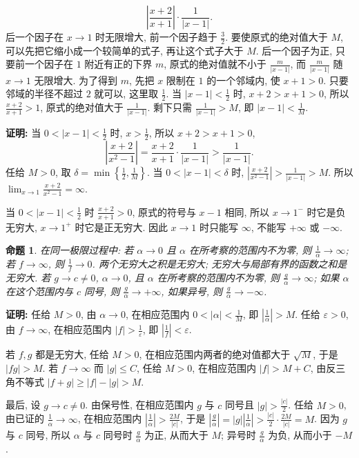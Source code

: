 \documentclass[UTF8,openany]{ctexbook}
\theoremstyle{chinesetextbook}
\newtheorem{proposition}{命题}[section]
\newenvironment{cnproof}{\par\indent\textbf{证明:} \ignorespaces}{\par}
\begin{document}
\[
\left|\frac{x+2}{x+1}\right|\cdot\frac1{|x-1|}.
\]
后一个因子在 $x\to1$ 时无限增大, 前一个因子趋于 $\displaystyle\frac32$. 要使原式的绝对值大于 $M$, 可以先把它缩小成一个较简单的式子, 再让这个式子大于 $M$. 后一个因子为正, 只要前一个因子在 $1$ 附近有正的下界 $m$, 原式的绝对值就不小于 $\displaystyle\frac m{|x-1|}$, 而 $\displaystyle\frac m{|x-1|}$ 随 $x\to1$ 无限增大. 为了得到 $m$, 先把 $x$ 限制在 $1$ 的一个邻域内, 使 $x+1>0$. 只要邻域的半径不超过 $2$ 就可以, 这里取 $\displaystyle\frac12$. 当 $\displaystyle|x-1|<\frac12$ 时, $x+2>x+1>0$, 所以 $\displaystyle\frac{x+2}{x+1}>1$, 原式的绝对值大于 $\displaystyle\frac1{|x-1|}$. 剩下只需 $\displaystyle\frac1{|x-1|}>M$, 即 $\displaystyle|x-1|<\frac1M$.
\begin{cnproof}
当 $\displaystyle0<|x-1|<\frac12$ 时, $\displaystyle x>\frac12$, 所以 $x+2>x+1>0$,
\[
\left|\frac{x+2}{x^2-1}\right|=\frac{x+2}{x+1}\cdot\frac1{|x-1|}>\frac1{|x-1|}.
\]
任给 $M>0$, 取 $\displaystyle\delta=\min\left\{\frac12,\frac1M\right\}$. 当 $0<|x-1|<\delta$ 时, $\displaystyle\left|\frac{x+2}{x^2-1}\right|>\frac1{|x-1|}>M$. 所以 $\displaystyle\lim_{x\to1}\frac{x+2}{x^2-1}=\infty$.
\end{cnproof}
当 $\displaystyle0<|x-1|<\frac12$ 时 $\displaystyle\frac{x+2}{x+1}>0$, 原式的符号与 $x-1$ 相同, 所以 $x\to1^-$ 时它是负无穷大, $x\to1^+$ 时它是正无穷大. 因此 $x\to1$ 时只能写 $\infty$, 不能写 $+\infty$ 或 $-\infty$.
\begin{proposition}
在同一极限过程中: 若 $\alpha\to0$ 且 $\alpha$ 在所考察的范围内不为零, 则 $\displaystyle\frac1\alpha\to\infty$; 若 $f\to\infty$, 则 $\displaystyle\frac1f\to0$. 两个无穷大之积是无穷大; 无穷大与局部有界的函数之和是无穷大. 若 $g\to c\ne0$, $\alpha\to0$, 且 $\alpha$ 在所考察的范围内不为零, 则 $\displaystyle\frac g\alpha\to\infty$; 如果 $\alpha$ 在这个范围内与 $c$ 同号, 则 $\displaystyle\frac g\alpha\to+\infty$, 如果异号, 则 $\displaystyle\frac g\alpha\to-\infty$.
\end{proposition}
\begin{cnproof}
任给 $M>0$, 由 $\alpha\to0$, 在相应范围内 $\displaystyle0<|\alpha|<\frac1M$, 即 $\displaystyle\left|\frac1\alpha\right|>M$. 任给 $\varepsilon>0$, 由 $f\to\infty$, 在相应范围内 $\displaystyle|f|>\frac1\varepsilon$, 即 $\displaystyle\left|\frac1f\right|<\varepsilon$.

若 $f,g$ 都是无穷大, 任给 $M>0$, 在相应范围内两者的绝对值都大于 $\sqrt M$, 于是 $|fg|>M$. 若 $f\to\infty$ 而 $|g|\le C$, 任给 $M>0$, 在相应范围内 $|f|>M+C$, 由反三角不等式 $|f+g|\ge|f|-|g|>M$.

最后, 设 $g\to c\ne0$. 由保号性, 在相应范围内 $g$ 与 $c$ 同号且 $\displaystyle|g|>\frac{|c|}2$. 任给 $M>0$, 由已证的 $\displaystyle\frac1\alpha\to\infty$, 在相应范围内 $\displaystyle\left|\frac1\alpha\right|>\frac{2M}{|c|}$, 于是 $\displaystyle\left|\frac g\alpha\right|=|g|\left|\frac1\alpha\right|>\frac{|c|}2\cdot\frac{2M}{|c|}=M$. 因为 $g$ 与 $c$ 同号, 所以 $\alpha$ 与 $c$ 同号时 $\displaystyle\frac g\alpha$ 为正, 从而大于 $M$; 异号时 $\displaystyle\frac g\alpha$ 为负, 从而小于 $-M$.
\end{cnproof}
\end{document}
